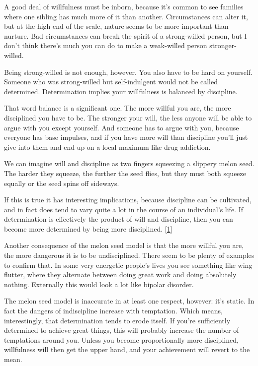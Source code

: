 A good deal of willfulness must be inborn, because it's common to see
families where one sibling has much more of it than another.
Circumstances can alter it, but at the high end of the scale, nature
seems to be more important than nurture. Bad circumstances can break the
spirit of a strong-willed person, but I don't think there's much you can
do to make a weak-willed person stronger-willed.

Being strong-willed is not enough, however. You also have to be hard on
yourself. Someone who was strong-willed but self-indulgent would not be
called determined. Determination implies your willfulness is balanced by
discipline.

That word balance is a significant one. The more willful you are, the
more disciplined you have to be. The stronger your will, the less anyone
will be able to argue with you except yourself. And someone has to argue
with you, because everyone has base impulses, and if you have more will
than discipline you'll just give into them and end up on a local maximum
like drug addiction.

We can imagine will and discipline as two fingers squeezing a slippery
melon seed. The harder they squeeze, the further the seed flies, but
they must both squeeze equally or the seed spins off sideways.

If this is true it has interesting implications, because discipline can
be cultivated, and in fact does tend to vary quite a lot in the course
of an individual's life. If determination is effectively the product of
will and discipline, then you can become more determined by being more
disciplined. {[}\hyperref[f1n]{1}{]}

Another consequence of the melon seed model is that the more willful you
are, the more dangerous it is to be undisciplined. There seem to be
plenty of examples to confirm that. In some very energetic people's
lives you see something like wing flutter, where they alternate between
doing great work and doing absolutely nothing. Externally this would
look a lot like bipolar disorder.

The melon seed model is inaccurate in at least one respect, however:
it's static. In fact the dangers of indiscipline increase with
temptation. Which means, interestingly, that determination tends to
erode itself. If you're sufficiently determined to achieve great things,
this will probably increase the number of temptations around you. Unless
you become proportionally more disciplined, willfulness will then get
the upper hand, and your achievement will revert to the mean.

